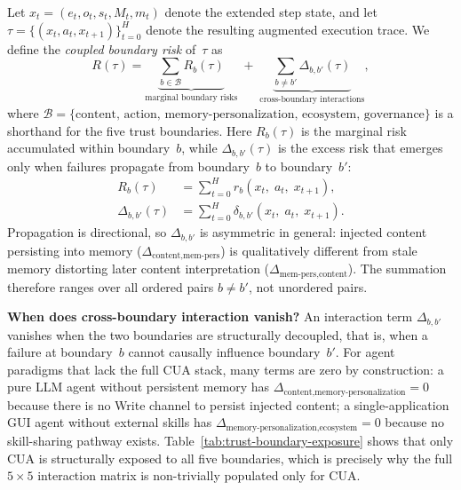 Let $x_t = (e_t, o_t, s_t, M_t, m_t)$ denote the extended step state, and let $\tau = \{(x_t, a_t, x_{t+1})\}_{t=0}^{H}$ denote the resulting augmented execution trace. We define the \emph{coupled boundary risk} of~$\tau$ as
\begin{equation}
  R(\tau) = \underbrace{\sum_{b \in \mathcal{B}} R_b(\tau)}_{\text{marginal boundary risks}} \;+\; \underbrace{\sum_{b \neq b'} \Delta_{b,b'}(\tau)}_{\text{cross-boundary interactions}},
  \label{eq:coupled-risk}
\end{equation}
where $\mathcal{B} = \{\text{content},\, \text{action},\, \text{memory-personalization},\, \text{ecosystem},\, \text{governance}\}$ is a shorthand for the five trust boundaries. Here $R_b(\tau)$ is the marginal risk accumulated within boundary~$b$, while $\Delta_{b,b'}(\tau)$ is the excess risk that emerges only when failures propagate from boundary~$b$ to boundary~$b'$:
\begin{align}
  R_b(\tau) &= \sum_{t=0}^{H} r_b(x_t,\; a_t,\; x_{t+1}), \label{eq:marginal-risk} \\
  \Delta_{b,b'}(\tau) &= \sum_{t=0}^{H} \delta_{b,b'}(x_t,\; a_t,\; x_{t+1}). \label{eq:interaction-risk}
\end{align}
Propagation is directional, so $\Delta_{b,b'}$ is asymmetric in general: injected content persisting into memory ($\Delta_{\text{content},\text{mem-pers}}$) is qualitatively different from stale memory distorting later content interpretation ($\Delta_{\text{mem-pers},\text{content}}$). The summation therefore ranges over all ordered pairs $b \neq b'$, not unordered pairs.

\smallskip
\noindent\textbf{When does cross-boundary interaction vanish?}
An interaction term $\Delta_{b,b'}$ vanishes when the two boundaries are structurally decoupled, that is, when a failure at boundary~$b$ cannot causally influence boundary~$b'$. For agent paradigms that lack the full CUA stack, many terms are zero by construction: a pure LLM agent without persistent memory has $\Delta_{\text{content},\text{memory-personalization}} = 0$ because there is no Write channel to persist injected content; a single-application GUI agent without external skills has $\Delta_{\text{memory-personalization},\text{ecosystem}} = 0$ because no skill-sharing pathway exists. Table~\ref{tab:trust-boundary-exposure} shows that only CUA is structurally exposed to all five boundaries, which is precisely why the full $5 \times 5$ interaction matrix is non-trivially populated only for CUA.

